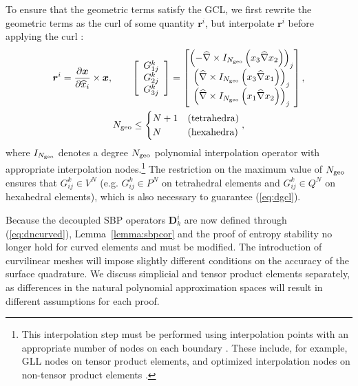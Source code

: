 \documentclass{svjour3}                     %
\renewcommand{\hat}{\widehat}
\newcommand{\pd}[2]{\frac{\partial#1}{\partial#2}}
\newcommand{\LRp}[1]{\left( #1 \right)}
\newcommand{\LRs}[1]{\left[ #1 \right]}
\newcommand{\Grad} {\ensuremath{\nabla}}
\begin{document}
To ensure that the geometric terms satisfy the GCL, we first rewrite the geometric terms as the curl of some quantity $\bm{r}^i$, but interpolate $\bm{r}^i$ before applying the curl \cite{visbal2002use, kopriva2006metric, hindenlang2012explicit, chan2018discretely}:
\begin{gather}
\bm{r}^i = { \pd{\bm{x}}{\hat{x}_i}\times \bm{x}}, \qquad
\LRs{\begin{array}{c}
{G}^k_{1j}\\
{G}^k_{2j}\\
{G}^k_{3j}\end{array}} = \begin{bmatrix}
\LRp{-\hat{\Grad}\times I_{N_{\rm geo}}\LRp{x_3\hat{\Grad}x_2}}_j\\
\LRp{\hat{\Grad}\times I_{N_{\rm geo}}\LRp{x_3\hat{\Grad}x_1}}_j\\
\LRp{\hat{\Grad}\times I_{N_{\rm geo}}\LRp{x_1\hat{\Grad}x_2}}_j
\end{bmatrix},\\
N_{\rm geo} \leq \begin{cases}
N+1 & \text{(tetrahedra)}\\
N & \text{(hexahedra)}
\end{cases},\nonumber
\label{eq:iconscurl}
\end{gather}
where $I_{N_{\rm geo}}$ denotes a degree $N_{\rm geo}$ polynomial interpolation operator with appropriate interpolation nodes.\footnote{This interpolation step must be performed using interpolation points with an appropriate number of nodes on each boundary \cite{chan2018discretely}.  These include, for example, GLL nodes on tensor product elements, and optimized interpolation nodes on non-tensor product elements \cite{hesthaven1998electrostatics, warburton2006explicit, chan2015comparison}.}  The restriction on the maximum value of $N_{\rm geo}$ ensures that $G^k_{ij} \in V^N$ (e.g. $G^k_{ij} \in P^N$ on tetrahedral elements and $G^k_{ij}\in Q^N$ on hexahedral elements), which is also necessary to guarantee (\ref{eq:dgcl}).

Because the decoupled SBP operators $\bm{D}^i_k$ are now defined through (\ref{eq:dncurved}), Lemma~\ref{lemma:sbpcor} and the proof of entropy stability no longer hold for curved elements and must be modified.  The introduction of curvilinear meshes will impose slightly different conditions on the accuracy of the surface quadrature.  We discuss simplicial and tensor product elements separately, as differences in the natural polynomial approximation spaces will result in different assumptions for each proof.
\end{document}
